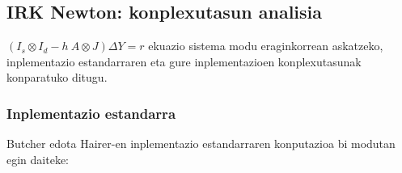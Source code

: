 \subsection{IRK Newton: konplexutasun analisia}

$(I_s \otimes I_d - h \ A \otimes J) \Delta Y = r$ ekuazio sistema modu eraginkorrean askatzeko, inplementazio estandarraren \cite{Butcher1976,Hairer1996} eta gure inplementazioen konplexutasunak konparatuko ditugu.

\subsubsection*{Inplementazio estandarra}

Butcher \cite{Butcher1976} edota Hairer-en inplementazio \cite{Hairer1996} estandarraren konputazioa bi modutan egin daiteke:

